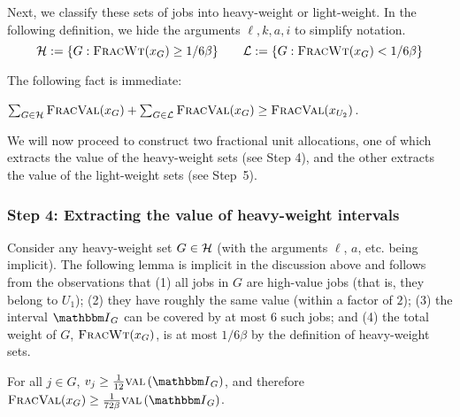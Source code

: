 Next, we classify these sets of jobs into heavy-weight or light-weight. In the following definition, we hide the arguments $\ell,k,a,i$ to simplify notation.
\[{\mathcal{H}} := \{G : {\normalfont\textsc{FracWt}}(x_G) \ge 1/6\beta\} \quad \quad {\mathcal{L}} := \{G : {\normalfont\textsc{FracWt}}(x_G) < 1/6\beta\} \]

\noindent
The following fact is immediate:

\begin{fact}
  \label{fact:heavy-light-classification}
  $\sum_{G\in{\mathcal{H}}}{\normalfont\textsc{FracVal}}(x_G) + \sum_{G\in{\mathcal{L}}} {\normalfont\textsc{FracVal}}(x_G) \ge {\normalfont\textsc{FracVal}}(x_{U_2})$. 
\end{fact}

We will now proceed to construct two fractional unit allocations, one of which
extracts the value of the heavy-weight sets (see Step 4), and the other
extracts the value of the light-weight sets (see Step~5).

\subsubsection*{Step 4: Extracting the value of heavy-weight intervals}

Consider any heavy-weight set $G\in{\mathcal{H}}$ (with the arguments $\ell$, $a$,
etc. being implicit). The following lemma is implicit in the discussion above
and follows from the observations that (1) all jobs in $G$ are high-value jobs
(that is, they belong to $U_1$); (2) they have roughly the same value (within a
factor of $2$); (3) the interval $\Int_G$ can be covered by at most $6$ such
jobs; and (4) the total weight of $G$, ${\normalfont\textsc{FracWt}}(x_G)$, is at most $1/6\beta$ by
the definition of heavy-weight sets. 
\begin{lemma}
    \label{lem:heavy-Gs}
    For all $j\in G$, $\valj \ge \frac 1{12} \fvI[\Int_G]$, and therefore
    $\fval(x_G)\ge \frac 1{72\beta} \fvI[\Int_G]$.
\end{lemma}

